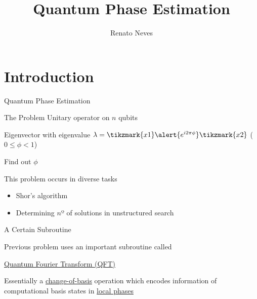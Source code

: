 \documentclass{beamer}
\author[Renato Neves]{Renato Neves}
\date{}
\begin{document}
\title{Quantum Phase Estimation}

\frame[plain]{\titlepage}

\section{Introduction}

\begin{frame}{Quantum Phase Estimation}
        \begin{block}{The Problem}
                Unitary operator on $n$ qubits

                Eigenvector with eigenvalue $\lambda = 
                \tikzmark{x1}\alert{e^{i 2 \pi \phi}} \tikzmark{x2}$ ($0 \leq \phi < 1$)

                Find out $\phi$
        \end{block}


        \pause
        This problem occurs in diverse tasks
        \begin{itemize}
                \item Shor's algorithm
                \item Determining $n$º of solutions in unstructured search
        \end{itemize}
\end{frame}        

\begin{frame}{A Certain Subroutine}

        Previous problem uses an important subroutine called
        \begin{center}
                \alert{\underline{Quantum Fourier Transform (QFT)}}
        \end{center}

        Essentially a \alert{\underline{change-of-basis}} operation which
        encodes information of computational basis states in
        \alert{\underline{local phases}}

\end{frame}
\end{document}
